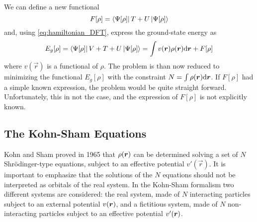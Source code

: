 We can define a new functional
\begin{equation}
    F[\rho] = \bra{\Psi[\rho]} T+U \ket{\Psi[\rho]}
\end{equation}
and, using \cref{eq:hamiltonian_DFT}, express the ground-state energy as
\begin{equation} \label{eq:ground_functional}
    E_g[\rho] = \bra{\Psi[\rho]} V+T+U \ket{\Psi[\rho]} = \int v(\vec{r}) \rho(\vec{r}) \differential \vec{r} + F[\rho]
\end{equation}
where $v(\vec{r})$ is a functional of $\rho$. The problem is than now reduced to minimizing the functional $E_g[\rho]$ with the constraint $N = \int \rho(\vec{r}) \differential \vec{r}$. If $F[\rho]$ had a simple known expression, the problem would be quite straight forward. Unfortunately, this in not the case, and the expression of $F[\rho]$ is not explicitly known.

\subsection{The Kohn-Sham Equations}
Kohn and Sham proved in 1965 that $\rho(\mathbf{\boldsymbol{r}})$ can be determined solving a set of $N$ Shrödinger-type equations, subject to an effective potential $v'(\vec{r})$. It is important to emphasize that the solutions of the $N$ equations should not be interpreted as orbitals of the real system. In the Kohn-Sham formalism two different systems are considered: the real system, made of $N$ interacting particles subject to an external potential $v(\mathbf{\boldsymbol{r}})$, and a fictitious system, made of $N$ non-interacting particles subject to an effective potential $v'(\mathbf{\boldsymbol{r}})$.

